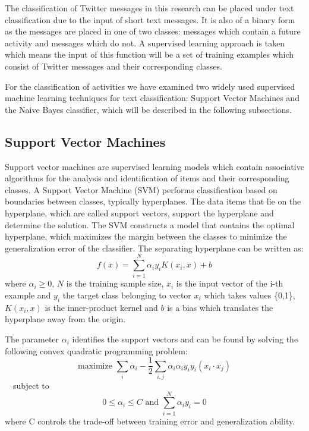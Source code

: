 The classification of Twitter messages in this research can be placed under text classification due to the input of short text messages. It is also of a binary form as the messages are placed in one of two classes: messages which contain a future activity and messages which do not. A supervised learning approach is taken which means the input of this function will be a set of training examples which consist of Twitter messages and their corresponding classes.

For the classification of activities we have examined two widely used supervised machine learning techniques for text classification: Support Vector Machines and the Naive Bayes classifier, which will be described in the following subsections.

\subsection{Support Vector Machines}\label{sec:svm}
Support vector machines are supervised learning models which contain associative algorithms for the analysis and identification of items and their corresponding classes. A Support Vector Machine (SVM) performs classification based on boundaries between classes, typically hyperplanes. The data items that lie on the hyperplane, which are called support vectors, support the hyperplane and determine the solution. The SVM constructs a model that contains the optimal hyperplane, which maximizes the margin between the classes to minimize the generalization error of the classifier. The separating hyperplane can be written as:
\begin{equation}
f(x) = \displaystyle\sum\limits_{i=1}^N \alpha _i y_i K(x_i, x) + b
\end{equation}
where  $\alpha _i \geq 0$, $N$ is the training sample size, $x_i $ is the input vector of the i-th example and $y_i$ the target class belonging to vector $x_i$ which takes values \{0,1\}, $K(x_i,x)$ is the inner-product kernel and $b$ is a bias which translates the hyperplane away from the origin.

The parameter $\alpha _i$ identifies the support vectors and can be found by solving the following convex quadratic programming problem:
\begin{equation}
\text{maximize }\displaystyle\sum\limits_{i}\alpha _i - \frac{1}{2}\displaystyle\sum\limits_{i,j}  \alpha _i  \alpha _i  y_i y_i (x_i \cdot x_j)
\end{equation}
\indent \indent ~~subject to 
\begin{equation*}
0 \leq \alpha _i \leq C \text{ and }\displaystyle\sum\limits_{i=1}^N \alpha _i  y_i = 0
\end{equation*}
where C controls the trade-off between training error and generalization ability.

